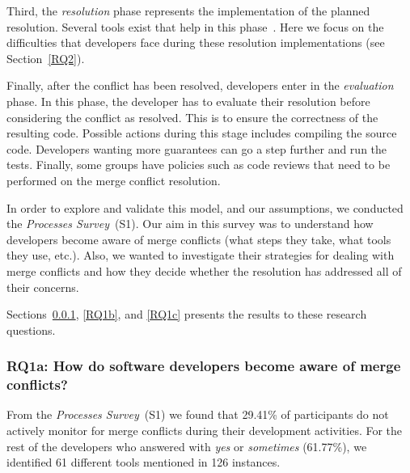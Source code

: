 Third, the \emph{resolution} phase represents the implementation of the planned resolution.
Several tools exist that help in this phase~\cite{nishimura,mens2002state,Brun2011}.
Here we focus on the difficulties that developers face during these resolution implementations (see Section~\ref{RQ2}).

Finally, after the conflict has been resolved, developers enter in the \emph{evaluation} phase.
In this phase, the developer has to evaluate their resolution before considering the conflict as resolved.
This is to ensure the correctness of the resulting code.
Possible actions during this stage includes compiling the source code.
Developers wanting more guarantees can go a step further and run the tests.
Finally, some groups have policies such as code reviews that need to be performed on the merge conflict resolution.
 
In order to explore and validate this model, and our assumptions, we conducted the \emph{Processes Survey}~(S1).
Our aim in this survey was to understand how developers become aware of merge conflicts (what steps they take, what tools they use, etc.).
Also, we wanted to investigate their strategies for dealing with merge conflicts and how they decide whether the resolution has addressed all of their concerns.

Sections~\ref{RQ1a}, \ref{RQ1b}, and \ref{RQ1c} presents the results to these research questions.

\subsubsection{\textbf{RQ1a:} How do software developers become \textbf{aware} of merge conflicts?}\label{RQ1a}

From the \textit{Processes Survey}~(S1) we found that 29.41\% of participants do not actively monitor for merge conflicts during their development activities.
For the rest of the developers who answered with \emph{yes} or \emph{sometimes} (61.77\%), we identified 61 different tools mentioned in 126 instances.

